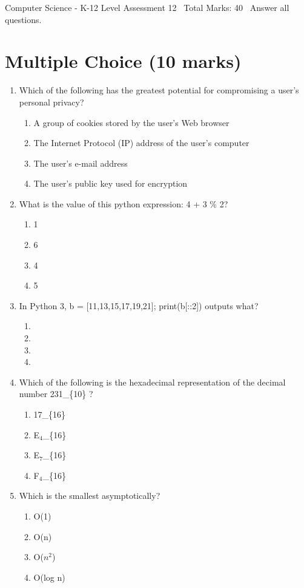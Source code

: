 \documentclass[12pt]{article}
\begin{document}
\begin{center}
Computer Science - K-12 Level Assessment 12 \
Total Marks: 40 \
Answer all questions.
\end{center}

\section*{Multiple Choice (10 marks)}
\begin{enumerate}[label=\arabic*.]
\item Which of the following has the greatest potential for compromising a user's personal privacy?
\begin{enumerate}[label=(\alph*)]
    \item A group of cookies stored by the user's Web browser
    \item The Internet Protocol (IP) address of the user's computer
    \item The user's e-mail address
    \item The user's public key used for encryption
\end{enumerate}
\item What is the value of this python expression: 4 + 3 \% 2?
\begin{enumerate}[label=(\alph*)]
    \item 1
    \item 6
    \item 4
    \item 5
\end{enumerate}
\item In Python 3, b = [11,13,15,17,19,21]; print(b[::2]) outputs what?
\begin{enumerate}[label=(\alph*)]
    \item [19,21]
    \item [11,15]
    \item [11,15,19]
    \item [13,17,21]
\end{enumerate}
\item Which of the following is the hexadecimal representation of the decimal number 231\_\{10\} ?
\begin{enumerate}[label=(\alph*)]
    \item 17\_\{16\}
    \item E$_{4}$\_\{16\}
    \item E$_{7}$\_\{16\}
    \item F$_{4}$\_\{16\}
\end{enumerate}
\item Which is the smallest asymptotically?
\begin{enumerate}[label=(\alph*)]
    \item O(1)
    \item O(n)
    \item O($n^2$)
    \item O(log n)
\end{enumerate}
\end{enumerate}
\end{document}

